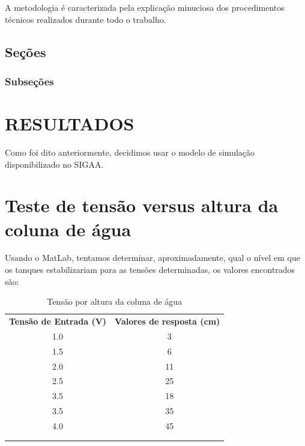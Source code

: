 \documentclass[a4paper,12pt]{article}
\begin{document}
\hspace{4ex}A metodologia é caracterizada pela explicação minuciosa dos procedimentos
técnicos realizados durante todo o trabalho.

\subsection{Seções}

\subsubsection{Subseções}

\newpage


\thispagestyle{main}

\section{RESULTADOS}
\hspace{4ex}Como foi dito anteriormente, decidimos usar o modelo de simulação disponibilizado no SIGAA. 

\section{Teste de tensão versus altura da coluna de água}

Usando o MatLab, tentamos determinar, aproximadamente, qual o nível em que os tanques estabilizariam para as tensões determinadas, os valores encontrados são:

\begin{table}[h]
	\centering
	\begin{tabular}{cc}
	\textbf{Tensão de Entrada (V)} & \textbf{Valores de resposta (cm)} \\
	1.0	& ~3 \\
	1.5	& ~6\\
	2.0	& ~11\\
	2.5	& ~25\\
	3.5 & ~18\\
	3.5	& ~35\\
	4.0 & ~45\\
		\multicolumn{1}{l}{} & \multicolumn{1}{l}{} \\
		\multicolumn{1}{l}{} & \multicolumn{1}{l}{}
	\end{tabular}
	\caption{Tensão por altura da coluna de água}
	\label{tab:my-table}
\end{table}
\end{document}
